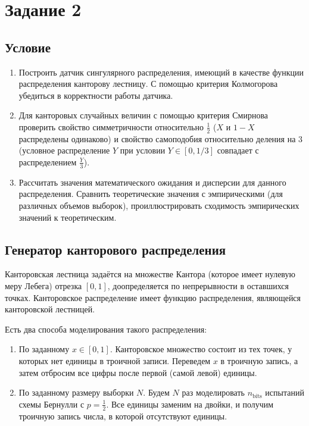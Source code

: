 \documentclass[11pt]{report}
\begin{document}
\section{Задание 2}

\subsection{Условие}

\begin{enumerate}
\item Построить датчик сингулярного распределения, имеющий в качестве функции распределения канторову лестницу. С помощью критерия Колмогорова убедиться в корректности работы датчика.
\item Для канторовых случайных величин с помощью критерия Смирнова проверить свойство симметричности относительно $\frac{1}{2}$ ($X$ и $1 - X$ распределены одинаково) и свойство самоподобия относительно деления на $3$ (условное распределение $Y$ при условии $Y \in [0, 1/3]$ совпадает с распределением $\frac{Y}{3}$).
\item Рассчитать значения математического ожидания и дисперсии для данного распределения. Сравнить теоретические значения с эмпирическими (для различных объемов выборок), проиллюстрировать сходимость эмпирических значений
к теоретическим.
\end{enumerate}

\subsection{Генератор канторового распределения}

Канторовская лестница задаётся на множестве Кантора (которое имеет нулевую меру Лебега) отрезка $[0,1]$, доопределяется по непрерывности в оставшихся точках. Канторовское распределение имеет функцию распределения, являющейся канторовской лестницей.

Есть два способа моделирования такого распределения:
\begin{enumerate}
\item По заданному $x\in[0,1]$. Канторовское множество состоит из тех точек, у которых нет единицы в троичной записи. Переведем $x$ в троичную запись, а затем отбросим все цифры после первой (самой левой) единицы.
\item По заданному размеру выборки $N$. Будем $N$ раз моделировать $n_{\operatorname{bits}}$ испытаний схемы Бернулли с $p=\frac{1}{2}$. Все единицы заменим на двойки, и получим троичную запись числа, в которой отсутствуют единицы.
\end{enumerate}
\end{document}

